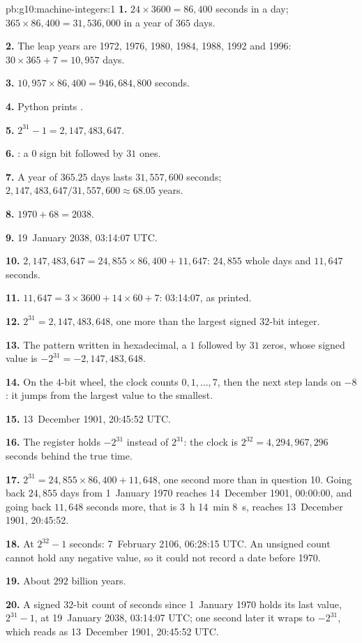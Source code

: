 \begin{solution}{pb:g10:machine-integers:1}
\textbf{1.} $24 \times 3600 = 86{,}400$ seconds in a day; $365 \times 86{,}400 = 31{,}536{,}000$ in a year of $365$ days.

\textbf{2.} The leap years are 1972, 1976, 1980, 1984, 1988, 1992 and 1996: $30 \times 365 + 7 = 10{,}957$ days.

\textbf{3.} $10{,}957 \times 86{,}400 = 946{,}684{,}800$ seconds.

\textbf{4.} Python prints .

\textbf{5.} $2^{31} - 1 = 2{,}147{,}483{,}647$.

\textbf{6.} : a $0$ sign bit followed by $31$ ones.

\textbf{7.} A year of $365.25$ days lasts $31{,}557{,}600$ seconds; $2{,}147{,}483{,}647 / 31{,}557{,}600 \approx 68.05$
years.

\textbf{8.} $1970 + 68 = 2038$.

\textbf{9.} 19~January 2038, 03:14:07 UTC.

\textbf{10.} $2{,}147{,}483{,}647 = 24{,}855 \times 86{,}400 + 11{,}647$: $24{,}855$ whole days and $11{,}647$ seconds.

\textbf{11.} $11{,}647 = 3 \times 3600 + 14 \times 60 + 7$: 03:14:07, as printed.

\textbf{12.} $2^{31} = 2{,}147{,}483{,}648$, one more than the largest signed $32$-bit integer.

\textbf{13.} The pattern written  in hexadecimal, a $1$ followed by $31$ zeros, whose signed
value is
$-2^{31} = -2{,}147{,}483{,}648$.

\textbf{14.} On the $4$-bit wheel, the clock counts $0, 1, \dots, 7$, then the next step lands on $-8$: it jumps from
the largest value to the smallest.

\textbf{15.} 13~December 1901, 20:45:52 UTC.

\textbf{16.} The register holds $-2^{31}$ instead of $2^{31}$: the clock is $2^{32} = 4{,}294{,}967{,}296$ seconds
behind the true time.

\textbf{17.} $2^{31} = 24{,}855 \times 86{,}400 + 11{,}648$, one second more than in question 10. Going back
$24{,}855$ days from 1~January 1970 reaches 14~December 1901, 00:00:00, and going back $11{,}648$ seconds more, that
is 3~h 14~min 8~s, reaches 13~December 1901, 20:45:52.

\textbf{18.} At $2^{32} - 1$ seconds: 7~February 2106, 06:28:15 UTC. An unsigned count cannot hold any negative
value, so it could not record a date before 1970.

\textbf{19.} About $292$ billion years.

\textbf{20.} A signed $32$-bit count of seconds since 1~January 1970 holds its last value, $2^{31} - 1$, at
19~January 2038, 03:14:07 UTC; one second later it wraps to $-2^{31}$, which reads as 13~December 1901, 20:45:52 UTC.
\end{solution}
